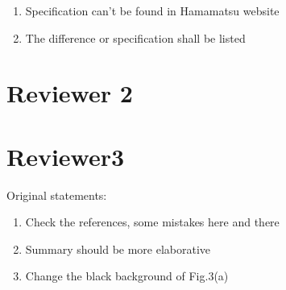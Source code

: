 \documentclass[]{article}
\begin{document}
\begin{enumerate}
	\item Specification can't be found in Hamamatsu website
	\item The difference or specification shall be listed
\end{enumerate}


\section{Reviewer 2}

\section{Reviewer3}
Original statements:
\begin{enumerate}
	\item Check the references, some mistakes here and there
	\item Summary should be more elaborative
	\item Change the black background of Fig.3(a)
\end{enumerate}
\end{document}

